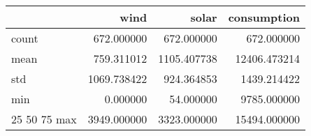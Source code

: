 \begin{tabular}{lrrr}
\toprule
 & wind & solar & consumption \\
\midrule
count & 672.000000 & 672.000000 & 672.000000 \\
mean & 759.311012 & 1105.407738 & 12406.473214 \\
std & 1069.738422 & 924.364853 & 1439.214422 \\
min & 0.000000 & 54.000000 & 9785.000000 \\
25%
50%
75%
max & 3949.000000 & 3323.000000 & 15494.000000 \\
\bottomrule
\end{tabular}
